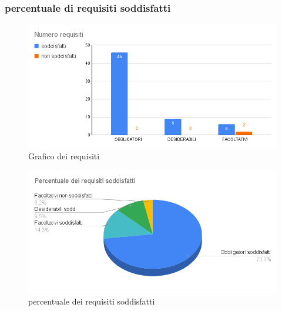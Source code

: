 \subsubsection{percentuale di requisiti soddisfatti}

    \begin{figure}[H]
        \centering
        \includegraphics[width=13 cm]{source/sections/images/num-requisiti.png}
        \caption{Grafico dei requisiti}
    \end{figure}

    \begin{figure}[H]
        \centering
        \includegraphics[width=13 cm]{source/sections/images/percentuale-requisiti.png}
        \caption{percentuale dei requisiti soddisfatti}
    \end{figure}

